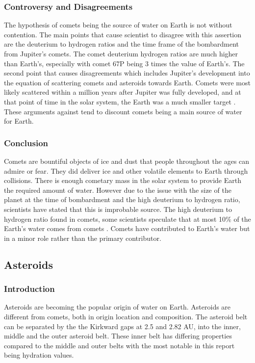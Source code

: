 \documentclass{article}
\begin{document}
\subsubsection{Controversy and Disagreements}
The hypothesis of comets being the source of water on Earth is not without contention. The main points that cause scientist to disagree with this assertion are the deuterium to hydrogen ratios and the time frame of the bombardment from Jupiter's comets.
The comet deuterium hydrogen ratios are much higher than Earth's, especially with comet 67P being 3 times the value of Earth's. 
The second point that causes disagreements which includes Jupiter's development into the equation of scattering comets and asteroids towards Earth. Comets were most likely scattered within a million years after Jupiter was fully developed, and at that point of time in the solar system, the Earth was a much smaller target \cite{morbidelli2000source}. 
These arguments against tend to discount comets being a main source of water for Earth.


\subsubsection{Conclusion}
Comets are bountiful objects of ice and dust that people throughout the ages can admire or fear. They did deliver ice and other volatile elements to Earth through collisions.
There is enough cometary mass in the solar system to provide Earth the required amount of water. 
However due to the issue with the size of the planet at the time of bombardment and the high deuterium to hydrogen ratio, scientists have stated that this is improbable source.
The high deuterium to hydrogen ratio found in comets, some scientists speculate that at most 10\% of the Earth's water comes from comets \cite{morbidelli2000source}.
Comets have contributed to Earth's water but in a minor role rather than the primary contributor.

\subsection{Asteroids}
\subsubsection{Introduction}
Asteroids are becoming the popular origin of water on Earth.
Asteroids are different from comets, both in origin location and composition.
The asteroid belt can be separated by the the Kirkward gaps at 2.5 and 2.82 AU\cite{AsteroidBelt}, into the inner, middle and the outer asteroid belt.
These inner belt has differing properties compared to the middle and outer belts with the most notable in this report being hydration values.
\end{document}
